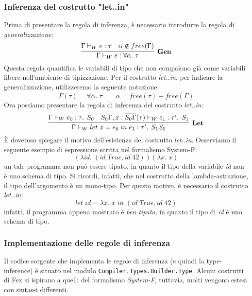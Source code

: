 \documentclass[10pt,a4paper]{article}
\begin{document}
\hypertarget{Inferenza del costrutto "let..in"}{\subsubsection{Inferenza del costrutto "let..in"}}
Prima di presentare la regola di inferenza, è necessario introdurre la regola di \textit{generalizzazione}:
\[ \infer[\textbf{Gen}]{\Gamma \vdash_W e : \forall \alpha. \; \tau}{\Gamma \vdash_W e : \tau & \alpha \notin free(\Gamma)} \]
Questa regola quantifica le variabili di tipo che non compaiono già come variabili libere nell'ambiente di tipizzazione.
Per il costrutto \textit{let..in}, per indicare la generalizzazione, utilizzeremo la seguente notazione:
\[ \overline{\Gamma}(\tau) = \forall \overline{\alpha}. \; \tau \qquad \overline{\alpha} = free(\tau) - free(\Gamma) \]
Ora possiamo presentare la regola di inferenza del costrutto \textit{let..in}:
\[ \infer[\textbf{Let}]{\Gamma \vdash_W let \; x = e_0 \; in \; e_1 : \tau', \; S_1S_0}{\Gamma \vdash_W e_0 : \tau, \; S_0 & S_0\Gamma, x : \overline{S_0\Gamma}(\tau) \vdash_W e_1 : \tau', \; S_1} \]
\`E doveroso spiegare il motivo dell'esistenza del costrutto \textit{let..in}. Osserviamo il seguente esempio di
espressione scritta nel formalismo System-F:
\[ (\lambda id. \; (id \; True, id \; 42)) (\lambda x. \; x) \]
un tale programma non può essere tipato, in quanto il tipo della variabile \textit{id} non è uno schema di tipo. Si ricordi,
infatti, che nel costrutto della lambda-astrazione, il tipo dell'argomento è un mono-tipo. Per questo motivo, è
necessario il costrutto \textit{let..in}:
\[ let \; id = \lambda x. \; x \; in \; (id \; True, id \; 42) \]
infatti, il programma appena mostrato è \textit{ben tipato}, in quanto il tipo di \textit{id} è uno schema di tipo.

\hypertarget{Implementazione delle regole di inferenza}{\subsubsection{Implementazione delle regole di inferenza}}
Il codice sorgente che implementa le regole di inferenza (e quindi la type-inference) è situato nel modulo
\texttt{Compiler.Types.Builder.Type}. Alcuni costrutti di Fex si ispirano a quelli del formalismo \textit{System-F},
tuttavia, molti vengono estesi con sintassi differenti.
\end{document}
